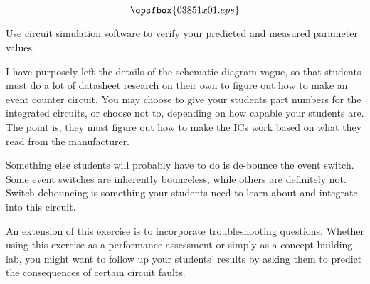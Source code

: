 

$$\epsfbox{03851x01.eps}$$

\vfil \eject






Use circuit simulation software to verify your predicted and measured parameter values.







I have purposely left the details of the schematic diagram vague, so that students must do a lot of datasheet research on their own to figure out how to make an event counter circuit.  You may choose to give your students part numbers for the integrated circuits, or choose not to, depending on how capable your students are.  The point is, they must figure out how to make the ICs work based on what they read from the manufacturer.

Something else students will probably have to do is de-bounce the event switch.  Some event switches are inherently bounceless, while others are definitely not.  Switch debouncing is something your students need to learn about and integrate into this circuit.

An extension of this exercise is to incorporate troubleshooting questions.  Whether using this exercise as a performance assessment or simply as a concept-building lab, you might want to follow up your students' results by asking them to predict the consequences of certain circuit faults.




